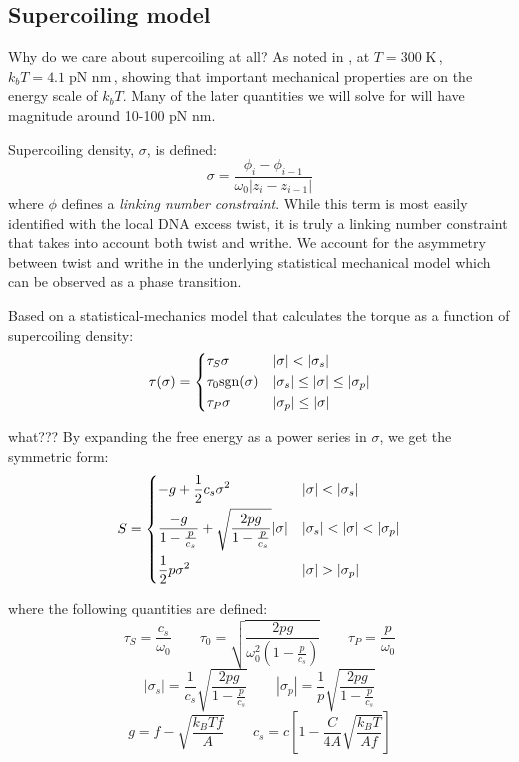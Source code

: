 \documentclass[11pt]{article}
\newcommand{\unit}[1]{\; \text{#1}\,}
\begin{document}
\subsection{Supercoiling model}
Why do we care about supercoiling at all? As noted in \textcite{markoTorqueDynamicsLinking2007}, at \(T = 300 \unit{K}\), \(k_b T = 4.1 \unit{pN nm}\), showing that
important mechanical properties are on the energy scale of \(k_b T\). Many of the later quantities we will solve for will have magnitude around 10-100 pN nm.

Supercoiling density, \(\sigma\),  is defined:
\begin{equation}
    \sigma = \frac{\phi_i - \phi_{i - 1}}{\omega_0 | z_{i} - z_{i-1}|}
    \label{eq:sc_density}
\end{equation}
where \(\phi\) defines a \emph{linking number constraint}. While this term is most easily identified with the local DNA excess twist, it is truly a linking number constraint that takes into account both twist and writhe. We account for the asymmetry between twist and writhe in the underlying statistical mechanical model which can be observed as a phase transition.

Based on a statistical-mechanics model that calculates the torque as a function of supercoiling density:
\begin{equation}
    \tau(\sigma) = \begin{dcases} \tau_S \sigma & |\sigma| < |\sigma_s| \\ \tau_0 \text{sgn}(\sigma) & |\sigma_s| \leq |\sigma | \leq |\sigma_p| \\ \tau_P \sigma & |\sigma_p| \leq |\sigma|\end{dcases}
\end{equation}

what???
By expanding the free energy as a power series in \(\sigma\), we get the symmetric form:
\begin{equation}
    S = \begin{dcases}
        -g + \frac{1}{2} c_s \sigma^2 & |\sigma| < |\sigma_s| \\
        \frac{-g}{1 - \frac{p}{c_s}} + \sqrt{\frac{2 p g}{1 - \frac{p}{c_s}}} |\sigma| & |\sigma_s| < |\sigma| < |\sigma_p| \\
        \frac{1}{2} p \sigma^2 & |\sigma| > |\sigma_p|
    \end{dcases}
\end{equation}

where the following quantities are defined:
\[\tau_S = \frac{c_s}{\omega_0} \qquad \tau_0 = \sqrt{\frac{2 pg}{\omega_0^2 \left(1 - \frac{p}{c_s}\right)}} \qquad \tau_P = \frac{p}{\omega_0} \]
\[|\sigma_s| = \frac{1}{c_s} \sqrt{\frac{2pg}{1 - \frac{p}{c_s}}} \qquad |\sigma_p| = \frac{1}{p} \sqrt{\frac{2pg}{1 - \frac{p}{c_s}}}\]
\[g = f - \sqrt{\frac{k_B T f}{A}} \qquad c_s = c \left[1 - \frac{C}{4A} \sqrt{\frac{k_B T}{A f}}\right]\]
\end{document}
